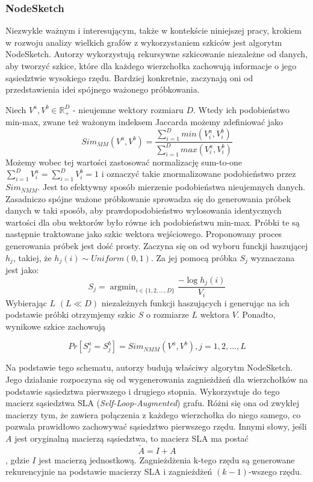         \subsubsection*{NodeSketch}
            Niezwykle ważnym i interesującym, także w kontekście niniejszej pracy, krokiem w rozwoju analizy wielkich grafów z wykorzystaniem szkiców jest algorytm NodeSketch\cite{Yang_Rosso_Li_Cudre-Mauroux_2019}. Autorzy wykorzystują rekursywne szkicowanie niezależne od danych, aby tworzyć szkice, które dla każdego wierzchołka zachowują informacje o jego sąsiedztwie wysokiego rzędu. Bardziej konkretnie, zaczynają oni od przedstawienia idei spójnego ważonego próbkowania. 
        
        Niech $V^a, V^b \in \mathbb{R}_{+}^{D}$ - nieujemne wektory rozmiaru $D$. Wtedy ich podobieństwo min-max, zwane też ważonym indeksem Jaccarda możemy zdefiniować jako 
        \[
            Sim_{MM}(V^a, V^b) = \frac{\sum \limits_{i = 1}^D min(V_i^{a}, V_i^{b})}{\sum \limits_{i = 1}^D max(V_i^{a}, V_i^{b})}
        \]
        Możemy wobec tej wartości zastosować normalizację sum-to-one $\sum \limits_{i = 1}^D V_{i}^{a} = \sum \limits_{i = 1}^D V_{i}^{b} = 1$ i oznaczyć takie znormalizowane podobieństwo przez $Sim_{NMM}$. Jest to efektywny sposób mierzenie podobieństwa nieujemnych danych\cite{10.1145/2783258.2783406}. Zasadniczo spójne ważone próbkowanie sprowadza się do generowania próbek danych w taki sposób, aby prawdopodobieństwo wylosowania identycznych wartości dla obu wektorów było równe ich podobieństwu min-max. Próbki te są następnie traktowane jako szkic wektora wejściowego. Proponowany proces generowania próbek jest dość prosty. Zaczyna się on od wyboru funckji haszującej $h_j$, takiej, że $h_j(i) \sim Uniform(0,1)$. Za jej pomocą próbka $S_j$ wyznaczana jest jako:
        \begin{equation} \label{eq:node_sketch_1}  
            S_j = \mathop{argmin}_{i \in \{1,2,\dots, D\}} \frac{-\log h_{j}(i)}{V_i}
        \end{equation}
        Wybierając $L$ $(L \ll D)$ niezależnych funkcji haszujących i generując na ich podstawie próbki otrzymjemy szkic $S$ o rozmiarze $L$ wektora $V$. Ponadto, wynikowe szkice zachowują
        
        \begin{equation} \label{eq:node_sketch_2}  
            Pr[S_{j}^{a} = S_{j}^{b}] = Sim_{NMM}(V^a, V^b), j = 1,2,\dots,L
        \end{equation}

        Na podstawie tego schematu, autorzy budują właściwy algorytm NodeSketch. Jego działanie rozpoczyna się od wygenerowania zagnieżdżeń dla wierzchołków na podstawie sąsiedztwa pierwszego i drugiego stopnia. Wykorzystuje do tego macierz sąsiedztwa SLA (\emph{Self-Loop-Augmented}) grafu. Różni się ona od zwykłej macierzy tym, że zawiera połączenia z każdego wierzchołka do niego samego, co pozwala prawidłowo zachowywać sąsiedztwo pierwszego rzędu. Innymi słowy, jeśli $A$ jest oryginalną macierzą sąsiedztwa, to macierz SLA ma postać 
        \[
            \tilde{A} = I + A
        \], gdzie $I$ jest macierzą jednostkową. Zagnieżdżenia k-tego rzędu są generowane rekurencyjnie na podstawie macierzy SLA i zagnieżdżeń $(k - 1)$-wszego rzędu. 

